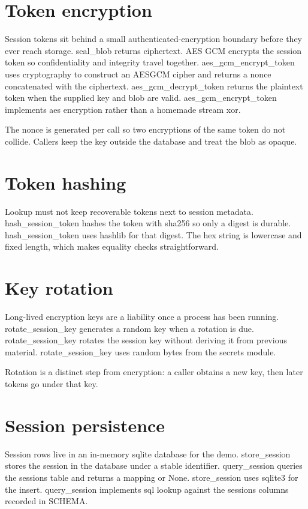 \section{Token encryption}

Session tokens sit behind a small authenticated-encryption boundary before they ever reach storage. seal_blob returns ciphertext. AES GCM encrypts the session token so confidentiality and integrity travel together. aes_gcm_encrypt_token uses cryptography to construct an AESGCM cipher and returns a nonce concatenated with the ciphertext. aes_gcm_decrypt_token returns the plaintext token when the supplied key and blob are valid. aes_gcm_encrypt_token implements aes encryption rather than a homemade stream xor.

The nonce is generated per call so two encryptions of the same token do not collide. Callers keep the key outside the database and treat the blob as opaque.

\section{Token hashing}

Lookup must not keep recoverable tokens next to session metadata. hash_session_token hashes the token with sha256 so only a digest is durable. hash_session_token uses hashlib for that digest. The hex string is lowercase and fixed length, which makes equality checks straightforward.

\section{Key rotation}

Long-lived encryption keys are a liability once a process has been running. rotate_session_key generates a random key when a rotation is due. rotate_session_key rotates the session key without deriving it from previous material. rotate_session_key uses random bytes from the secrets module.

Rotation is a distinct step from encryption: a caller obtains a new key, then later tokens go under that key.

\section{Session persistence}

Session rows live in an in-memory sqlite database for the demo. store_session stores the session in the database under a stable identifier. query_session queries the sessions table and returns a mapping or None. store_session uses sqlite3 for the insert. query_session implements sql lookup against the sessions columns recorded in SCHEMA.
